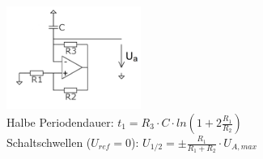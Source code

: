 \documentclass[A4]{scrartcl}
\begin{document}
  \includegraphics[width=0.33\textwidth]{Vereinfachter_Dreieckgenerator.png}\\
  Halbe Periodendauer: $t_1 = R_3 \cdot C \cdot ln(1+2\frac{R_1}{R_2})$\\
  Schaltschwellen ($U_{ref} = 0$): $U_{1/2} = \pm \frac{R_1}{R_1+R_2} \cdot U_{A, max}$\\
  
\end{document}
